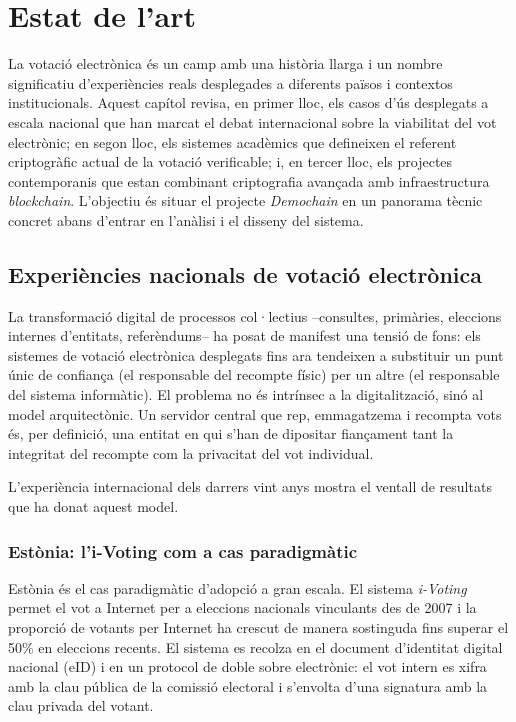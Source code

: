 
\chapter{Estat de l'art}
\label{cap:estat-art}

La votació electrònica és un camp amb una història llarga i un nombre
significatiu d'experiències reals desplegades a diferents països i
contextos institucionals. Aquest capítol revisa, en primer lloc, els
casos d'ús desplegats a escala nacional que han marcat el debat
internacional sobre la viabilitat del vot electrònic; en segon lloc,
els sistemes acadèmics que defineixen el referent criptogràfic actual
de la votació verificable; i, en tercer lloc, els projectes contemporanis
que estan combinant criptografia avançada amb infraestructura
\emph{blockchain}. L'objectiu és situar el projecte \emph{Demochain} en
un panorama tècnic concret abans d'entrar en l'anàlisi i el disseny
del sistema.

\section{Experiències nacionals de votació electrònica}
\label{sec:experiencies-nacionals}

La transformació digital de processos col·lectius --consultes, primàries,
eleccions internes d'entitats, referèndums-- ha posat de manifest una
tensió de fons: els sistemes de votació electrònica desplegats fins
ara tendeixen a substituir un punt únic de confiança (el responsable
del recompte físic) per un altre (el responsable del sistema
informàtic). El problema no és intrínsec a la digitalització, sinó al
model arquitectònic. Un servidor central que rep, emmagatzema i
recompta vots és, per definició, una entitat en qui s'han de
dipositar fiançament tant la integritat del recompte com la privacitat
del vot individual.

L'experiència internacional dels darrers vint anys mostra el ventall
de resultats que ha donat aquest model.

\subsection{Estònia: l'i-Voting com a cas paradigmàtic}

Estònia és el cas paradigmàtic d'adopció a gran escala. El sistema
\emph{i-Voting} permet el vot a Internet per a eleccions nacionals
vinculants des de 2007 \cite{e-estonia2024voting} i la proporció de
votants per Internet ha crescut de manera sostinguda fins superar el
50\% en eleccions recents. El sistema es recolza en el document
d'identitat digital nacional (eID) i en un protocol de doble sobre
electrònic: el vot intern es xifra amb la clau pública de la comissió
electoral i s'envolta d'una signatura amb la clau privada del votant.

